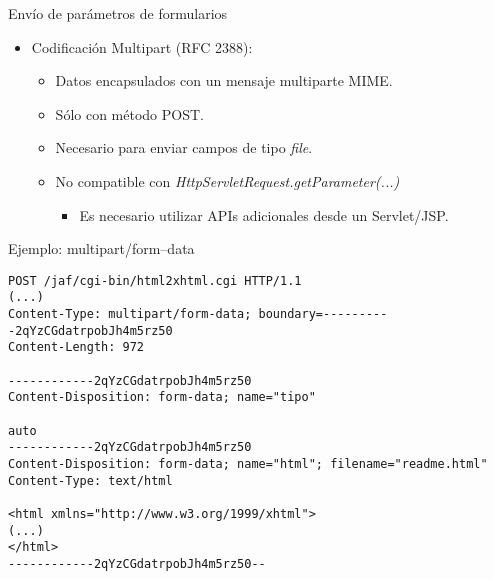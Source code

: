 \begin{slide}{Envío de parámetros de formularios}
  \begin{itemize}
  \item Codificación Multipart (RFC 2388):
    \begin{itemize}
    \item Datos encapsulados con un mensaje multiparte MIME.
    \item Sólo con método POST.
    \item Necesario para enviar campos de tipo \emph{file}.
    \item No compatible con
      \emph{HttpServletRequest.getParameter(...)}
      \begin{itemize}
      \item Es necesario utilizar APIs adicionales desde un Servlet/JSP.
      \end{itemize}
    \end{itemize}
  \end{itemize}
\end{slide}

\begin{slide}{Ejemplo: multipart/form--data}


\begin{Verbatim}[fontfamily=tt,fontsize=\fontsize{7}{7}]
POST /jaf/cgi-bin/html2xhtml.cgi HTTP/1.1
(...)
Content-Type: multipart/form-data; boundary=----------2qYzCGdatrpobJh4m5rz50
Content-Length: 972

------------2qYzCGdatrpobJh4m5rz50
Content-Disposition: form-data; name="tipo"

auto
------------2qYzCGdatrpobJh4m5rz50
Content-Disposition: form-data; name="html"; filename="readme.html"
Content-Type: text/html

<html xmlns="http://www.w3.org/1999/xhtml">
(...)
</html>
------------2qYzCGdatrpobJh4m5rz50--
\end{Verbatim}

\end{slide}


